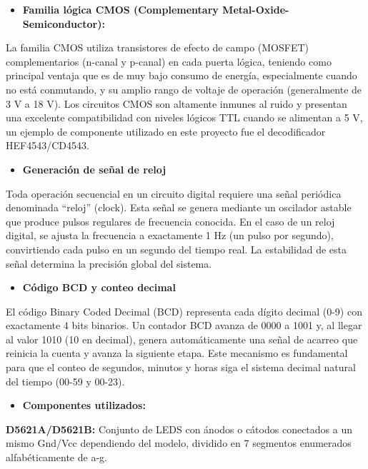 \documentclass[12pt,letterpaper]{article}
\begin{document}
\begin{itemize}
    \item \textbf{Familia lógica CMOS (Complementary Metal-Oxide-Semiconductor):}
\end{itemize}

\indent La familia CMOS utiliza transistores de efecto de campo (MOSFET) complementarios (n-canal y p-canal) en cada puerta lógica, teniendo como principal ventaja que es de muy bajo consumo de energía, especialmente cuando no está conmutando, y su amplio rango de voltaje de operación (generalmente de 3 V a 18 V). Los circuitos CMOS son altamente inmunes al ruido y presentan una excelente compatibilidad con niveles lógicos TTL cuando se alimentan a 5 V, un ejemplo de componente utilizado en este proyecto fue el decodificador HEF4543/CD4543.

\begin{itemize}
    \item \textbf{Generación de señal de reloj}
\end{itemize}

\indent Toda operación secuencial en un circuito digital requiere una señal periódica denominada “reloj” (clock). Esta señal se genera mediante un oscilador astable que produce pulsos regulares de frecuencia conocida. En el caso de un reloj digital, se ajusta la frecuencia a exactamente 1 Hz (un pulso por segundo), convirtiendo cada pulso en un segundo del tiempo real. La estabilidad de esta señal determina la precisión global del sistema.

\begin{itemize}
    \item \textbf{Código BCD y conteo decimal}
\end{itemize}

\indent El código Binary Coded Decimal (BCD) representa cada dígito decimal (0-9) con exactamente 4 bits binarios. Un contador BCD avanza de 0000 a 1001 y, al llegar al valor 1010 (10 en decimal), genera automáticamente una señal de acarreo que reinicia la cuenta y avanza la siguiente etapa. Este mecanismo es fundamental para que el conteo de segundos, minutos y horas siga el sistema decimal natural del tiempo (00-59 y 00-23).

\pagebreak

\begin{itemize}
    \item \textbf{Componentes utilizados:}
\end{itemize}

\textbf{D5621A/D5621B:} Conjunto de LEDS con ánodos o cátodos conectados a un mismo Gnd/Vcc dependiendo del modelo, dividido en 7 segmentos enumerados alfabéticamente de a-g.
\end{document}
